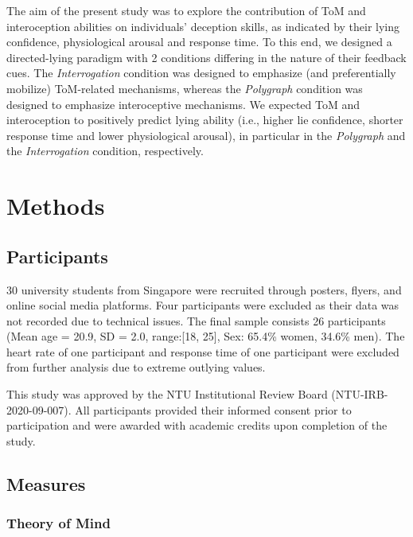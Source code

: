 \documentclass[
  man,floatsintext]{apa6}
\begin{document}
The aim of the present study was to explore the contribution of ToM and interoception abilities on individuals' deception skills, as indicated by their lying confidence, physiological arousal and response time. To this end, we designed a directed-lying paradigm with 2 conditions differing in the nature of their feedback cues. The \emph{Interrogation} condition was designed to emphasize (and preferentially mobilize) ToM-related mechanisms, whereas the \emph{Polygraph} condition was designed to emphasize interoceptive mechanisms. We expected ToM and interoception to positively predict lying ability (i.e., higher lie confidence, shorter response time and lower physiological arousal), in particular in the \emph{Polygraph} and the \emph{Interrogation} condition, respectively.

\hypertarget{methods}{%
\section{Methods}\label{methods}}

\hypertarget{participants}{%
\subsection{Participants}\label{participants}}

30 university students from Singapore were recruited through posters, flyers, and online social media platforms.
Four participants were excluded as their data was not recorded due to technical issues. The final sample consists 26 participants (Mean age = 20.9, SD = 2.0, range:{[}18, 25{]}, Sex: 65.4\% women, 34.6\% men). The heart rate of one participant and response time of one participant were excluded from further analysis due to extreme outlying values.

This study was approved by the NTU Institutional Review Board (NTU-IRB-2020-09-007). All participants provided their informed consent prior to participation and were awarded with academic credits upon completion of the study.

\hypertarget{measures}{%
\subsection{Measures}\label{measures}}

\hypertarget{theory-of-mind}{%
\subsubsection{Theory of Mind}\label{theory-of-mind}}
\end{document}
